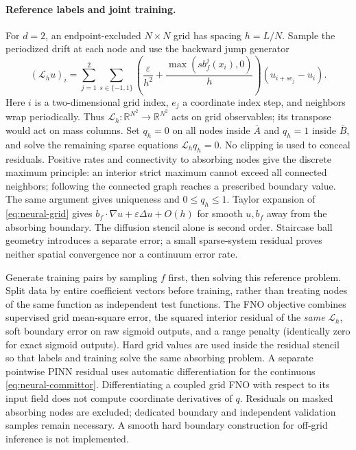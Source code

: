 \documentclass[12pt,a4paper,oneside]{book}
\begin{document}
\paragraph{Reference labels and joint training.}
For $d=2$, an endpoint-excluded $N\times N$ grid has spacing $h=L/N$. Sample the periodized drift at each node and
use the backward jump generator
\begin{equation}
 (\mathcal L_hu)_i=\sum_{j=1}^2\sum_{s\in\{-1,1\}}
 \left(\frac{\varepsilon}{h^2}+\frac{\max(s b_f^j(x_i),0)}h\right)(u_{i+s e_j}-u_i).
 \label{eq:neural-grid}
\end{equation}
Here $i$ is a two-dimensional grid index, $e_j$ a coordinate index step, and neighbors wrap periodically.
Thus $\mathcal L_h:\mathbb R^{N^2}\to\mathbb R^{N^2}$ acts on grid observables; its transpose would act on mass columns.
Set $q_h=0$ on all nodes inside $\overline A$ and $q_h=1$ inside $\overline B$, and solve the remaining sparse equations
$\mathcal L_hq_h=0$. No clipping is used to conceal residuals. Positive rates and connectivity to absorbing nodes give
the discrete maximum principle: an interior strict maximum cannot exceed all connected neighbors; following the
connected graph reaches a prescribed boundary value. The same argument gives uniqueness and $0\le q_h\le1$.
Taylor expansion of \eqref{eq:neural-grid} gives $b_f\cdot\nabla u+\varepsilon\Delta u+O(h)$ for smooth $u,b_f$
away from the absorbing boundary. The diffusion stencil alone is second order. Staircase ball geometry introduces a
separate error; a small sparse-system residual proves neither spatial convergence nor a continuum error rate.

Generate training pairs by sampling $f$ first, then solving this reference problem. Split data by entire coefficient
vectors before training, rather than treating nodes of the same function as independent test functions.
The FNO objective combines supervised grid mean-square error, the squared interior residual of the \emph{same}
$\mathcal L_h$, soft boundary error on raw sigmoid outputs, and a range penalty (identically zero for exact sigmoid
outputs). Hard grid values are used inside the residual stencil so that labels and training solve the same absorbing
problem. A separate pointwise PINN residual uses automatic differentiation for the continuous
\eqref{eq:neural-committor}. Differentiating a coupled grid FNO with respect to its input field does not compute
coordinate derivatives of $q$. Residuals on masked absorbing nodes are excluded; dedicated boundary and independent
validation samples remain necessary. A smooth hard boundary construction for off-grid inference is not implemented.
\end{document}
